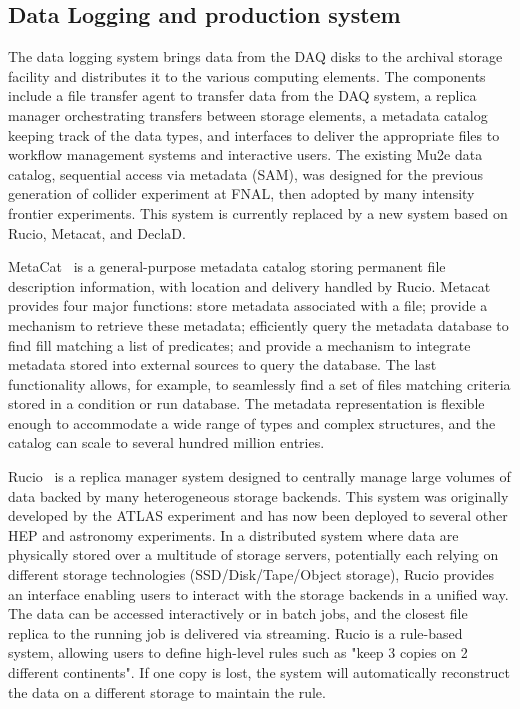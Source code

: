 \subsection{Data Logging and production system}
The data logging system brings data from the DAQ disks to the archival storage facility and distributes it to the various computing elements. The components include a file transfer agent to transfer data from the DAQ system, a replica manager orchestrating transfers between storage elements, a metadata catalog keeping track of the data types, and interfaces to deliver the appropriate files to workflow management systems and interactive users. The existing Mu2e data catalog, sequential access via metadata (SAM), was designed for the previous generation of collider experiment at FNAL, then adopted by many intensity frontier experiments. This system is currently replaced by a new system based on Rucio, Metacat, and DeclaD.

MetaCat~\cite{Mandrichenko:2021spd} is a general-purpose metadata catalog storing permanent file description information, with location and delivery handled by Rucio. Metacat provides four major functions: store metadata associated with a file; provide a mechanism to retrieve these metadata; efficiently query the metadata database to find fill matching a list of predicates; and provide a mechanism to integrate metadata stored into external sources to query the database. The last functionality allows, for example, to seamlessly find a set of files matching criteria stored in a condition or run database. The metadata representation is flexible enough to accommodate a wide range of types and complex structures, and the catalog can scale to several hundred million entries.

Rucio~\cite{Barisits:2019fyl} is a replica manager system designed to centrally manage large volumes of data backed by many heterogeneous storage backends. This system was originally developed by the ATLAS experiment and has now been deployed to several other HEP and astronomy experiments. In a distributed system where data are physically stored over a multitude of storage servers, potentially each relying on different storage technologies (SSD/Disk/Tape/Object storage), Rucio provides an interface enabling users to interact with the storage backends in a unified way. The data can be accessed interactively or in batch jobs, and the closest file replica to the running job is delivered via streaming. Rucio is a rule-based system, allowing users to define high-level rules such as "keep 3 copies on 2 different continents". If one copy is lost, the system will automatically reconstruct the data on a different storage to maintain the rule. 

